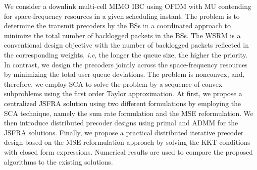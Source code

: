 We consider a downlink multi-cell \ac{MIMO} \ac{IBC} using \ac{OFDM} with \acl{MU} contending for space-frequency resources in a given scheduling instant. The problem is to determine the transmit precoders by the \acp{BS} in a coordinated approach to minimize the total number of backlogged packets in the \acp{BS}. The \ac{WSRM} is a conventional design objective with the number of backlogged packets reflected in the corresponding weights, \textit{i.e}, the longer the queue size, the higher the priority. In contrast, we design the precoders jointly across the space-frequency resources by minimizing the total user queue deviations. The problem is nonconvex, and, therefore, we employ \ac{SCA} to solve the problem by a sequence of convex subproblems using the first order Taylor approximation. At first, we propose a centralized \ac{JSFRA} solution using two different formulations by employing the \ac{SCA} technique, namely the sum rate formulation and the \ac{MSE} reformulation. We then introduce distributed precoder designs using primal and \ac{ADMM} for the \ac{JSFRA} solutions. Finally, we propose a practical distributed iterative precoder design based on the \ac{MSE} reformulation approach by solving the \acl{KKT} conditions with closed form expressions. Numerical results are used to compare the proposed algorithms to the existing solutions.



